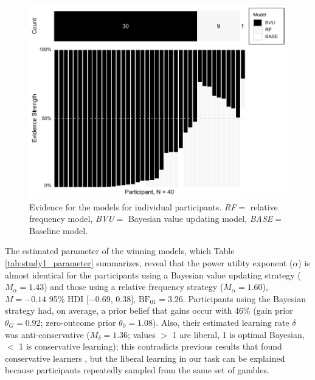 \documentclass[a4paper, man, floatsintext]{apa6}
\begin{document}
\begin{figure}[H]

{\centering \includegraphics{../figures/study1_model_weights-1} 

}

\caption{Evidence for the models for individual participants. \textit{RF}$=$ relative frequency model, \textit{BVU}$=$ Bayesian value updating model, \textit{BASE}$=$ Baseline model.}\label{fig:study1_model_weights}
\end{figure}

The estimated parameter of the winning models, which Table
\ref{tab:study1_parameter} summarizes, reveal that the power utility
exponent (\(\alpha\)) is almost identical for the participants using a
Bayesian value updating strategy (\(M_{\alpha}= 1.43\)) and those using
a relative frequency strategy (\(M_{\alpha}=1.60\)), \(M = -0.14\) 95\%
HDI \([-0.69\), \(0.38]\), \(\mathrm{BF}_{\textrm{01}} = 3.26\).
Participants using the Bayesian strategy had, on average, a prior belief
that gains occur with 46\% (gain prior \(\theta_G = 0.92\); zero-outcome
prior \(\theta_0 = 1.08\)). Also, their estimated learning rate
\(\delta\) was anti-conservative (\(M_{\delta}=1.36\); values \(>\) 1
are liberal, 1 is optimal Bayesian, \(<\) 1 is conservative learning);
this contradicts previous results that found conservative learners
\citep{Edwards1967,Tauber2017}, but the liberal learning in our task can
be explained because participants repeatedly sampled from the same set
of gambles.
\end{document}
